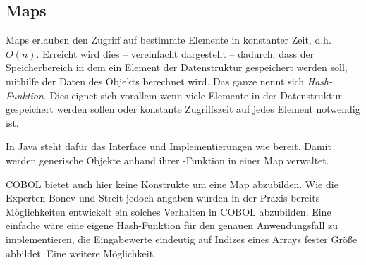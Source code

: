 \subsection{Maps}
Maps erlauben den Zugriff auf bestimmte Elemente in konstanter Zeit, d.h. $O(n)$. Erreicht wird dies -- vereinfacht dargestellt -- dadurch, dass der Speicherbereich in dem ein Element der Datenstruktur gespeichert werden soll, mithilfe der Daten des Objekts berechnet wird. Das ganze nennt sich \textit{Hash-Funktion}. Dies eignet sich vorallem wenn viele Elemente in der Datenstruktur gespeichert werden sollen oder konstante Zugriffszeit auf jedes Element notwendig ist.

In Java steht dafür das Interface  und Implementierungen wie  bereit. Damit werden generische Objekte anhand ihrer -Funktion in einer Map verwaltet.

COBOL bietet auch hier keine Konstrukte um eine Map abzubilden. Wie die Experten Bonev und Streit jedoch angaben wurden in der Praxis bereits Möglichkeiten entwickelt ein solches Verhalten in COBOL abzubilden. Eine einfache wäre eine eigene Hash-Funktion für den genauen Anwendungsfall zu implementieren, die Eingabewerte eindeutig auf Indizes eines Arrays fester Größe abbildet. Eine weitere Möglichkeit.